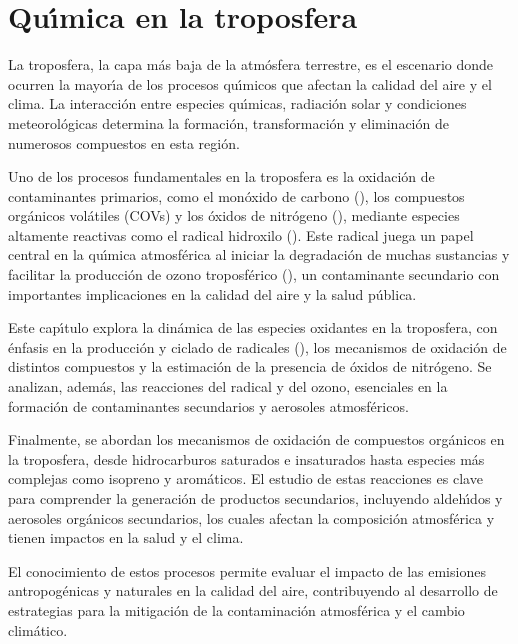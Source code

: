 %  
%  

\chapter[Quimica en la Troposfera]{Qu\'{\i}mica en la troposfera}
La troposfera, la capa m\'as baja de la atm\'osfera terrestre, es el escenario donde ocurren la mayor\'{\i}a de los procesos qu\'{\i}micos que afectan la calidad del aire y el clima. La interacci\'on entre especies qu\'{\i}micas, radiaci\'on solar y condiciones meteorol\'ogicas determina la formaci\'on, transformaci\'on y eliminaci\'on de numerosos compuestos en esta regi\'on.  

Uno de los procesos fundamentales en la troposfera es la oxidaci\'on de contaminantes primarios, como el mon\'oxido de carbono (), los compuestos org\'anicos vol\'atiles (COVs) y los \'oxidos de nitr\'ogeno (), mediante especies altamente reactivas como el radical hidroxilo (). Este radical juega un papel central en la qu\'{\i}mica atmosf\'erica al iniciar la degradaci\'on de muchas sustancias y facilitar la producci\'on de ozono troposf\'erico (), un contaminante secundario con importantes implicaciones en la calidad del aire y la salud p\'ublica.

Este cap\'{\i}tulo explora la din\'amica de las especies oxidantes en la troposfera, con \'enfasis en la producci\'on y ciclado de radicales (), los mecanismos de oxidaci\'on de distintos compuestos y la estimaci\'on de la presencia de \'oxidos de nitr\'ogeno. Se analizan, adem\'as, las reacciones del radical  y del ozono, esenciales en la formaci\'on de contaminantes secundarios y aerosoles atmosf\'ericos.

Finalmente, se abordan los mecanismos de oxidaci\'on de compuestos org\'anicos en la troposfera, desde hidrocarburos saturados e insaturados hasta especies m\'as complejas como isopreno y arom\'aticos. El estudio de estas reacciones es clave para comprender la generaci\'on de productos secundarios, incluyendo aldeh\'{\i}dos y aerosoles org\'anicos secundarios, los cuales afectan la composici\'on atmosf\'erica y tienen impactos en la salud y el clima.

El conocimiento de estos procesos permite evaluar el impacto de las emisiones antropog\'enicas y naturales en la calidad del aire, contribuyendo al desarrollo de estrategias para la mitigaci\'on de la contaminaci\'on atmosf\'erica y el cambio clim\'atico.

